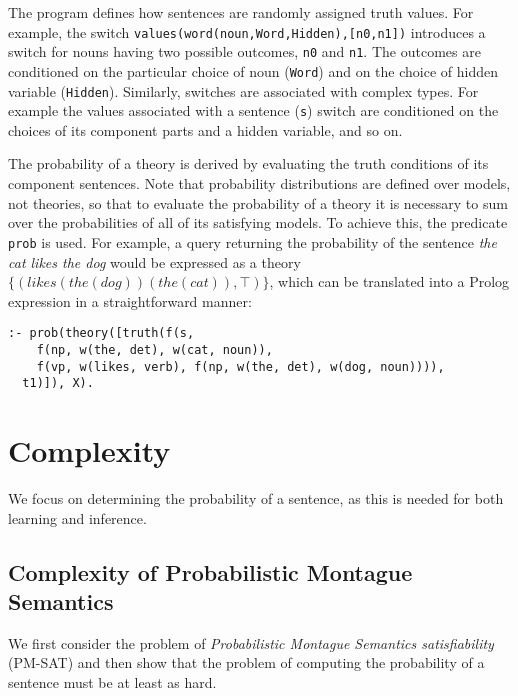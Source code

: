 \documentclass[manuscript]{clv2}
\newcommand{\hide}[1]{}
\begin{document}
The program defines how sentences are randomly assigned truth values. For example, the switch
\texttt{values(word(noun,Word,Hidden),[n0,n1])} 
introduces a switch for nouns having two possible outcomes, \texttt{n0} and \texttt{n1}.
The outcomes are conditioned on the particular choice of noun (\texttt{Word}) and on the choice of hidden variable (\texttt{Hidden}). Similarly, switches are associated with complex types. For example the values associated with a sentence (\texttt{s}) switch are conditioned on the choices of its component parts and a hidden variable, and so on.

The probability of a theory is derived by evaluating the truth
conditions of its component sentences.
Note that probability
distributions are defined over models, not theories, so that to
evaluate the probability of a theory it is necessary to sum over the
probabilities of all of its satisfying models. To achieve this, the
predicate \texttt{prob} is used.
For example, a query returning the
probability of the sentence {\em the cat likes the dog\/} would be expressed as a theory
$\{(\mathit{likes}(\mathit{the}(\mathit{dog}))(\mathit{the}(\mathit{cat})),\top)\}$,
which can be translated into a Prolog expression in a straightforward
manner:
\begin{Verbatim}[fontsize=\small]
:- prob(theory([truth(f(s,
    f(np, w(the, det), w(cat, noun)),
    f(vp, w(likes, verb), f(np, w(the, det), w(dog, noun)))),
  t1)]), X).
\end{Verbatim}



\section{Complexity}

We focus on determining the probability of a sentence,
as this is needed for both learning and inference.

\subsection{Complexity of Probabilistic Montague Semantics}

We first consider the problem of {\em Probabilistic Montague Semantics satisfiability\/} (PM-SAT) and then show that the problem of computing the probability of a sentence must be at least as hard.
\end{document}
